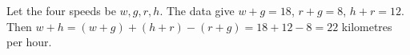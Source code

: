 Let the four speeds be $w,g,r,h$. The data give $w+g=18$, $r+g=8$, $h+r=12$. Then $w+h=(w+g)+(h+r)-(r+g)=18+12-8=\boxed{22}$ kilometres per hour.
